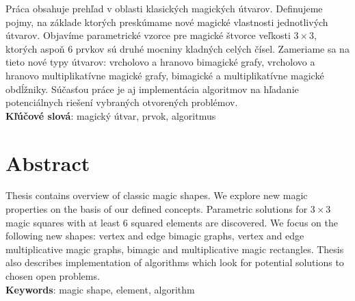\documentclass[12pt, oneside]{book}  %
\begin{document}
Práca obsahuje prehľad v oblasti klasických magických útvarov. Definujeme pojmy, na základe ktorých preskúmame nové magické vlastnosti jednotlivých útvarov. Objavíme parametrické vzorce pre magické štvorce veľkosti $3 \times 3$, ktorých aspoň $6$ prvkov sú druhé mocniny kladných celých čísel. Zameriame sa na tieto nové typy útvarov: vrcholovo a hranovo bimagické grafy, vrcholovo a hranovo multiplikatívne magické grafy, bimagické a multiplikatívne magické obdĺžniky. Súčasťou práce je aj implementácia algoritmov na hľadanie potenciálnych riešení vybraných otvorených problémov. \\

\textbf{Kľúčové slová}: magický útvar, prvok, algoritmus


\newpage 
\section*{Abstract}

Thesis contains overview of classic magic shapes. We explore new magic properties on the basis of our defined concepts. Parametric solutions for $3 \times 3$ magic squares with at least $6$ squared elements are discovered. We focus on the following new shapes: vertex and edge bimagic graphs, vertex and edge multiplicative magic graphs, bimagic and multiplicative magic rectangles. Thesis also describes implementation of algorithms which look for potential solutions to chosen open problems. \\

\textbf{Keywords}: magic shape, element, algorithm


%
%


\end{document}
